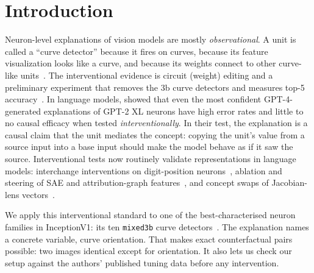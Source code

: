\documentclass[11pt]{article}
\begin{document}
\section{Introduction}
Neuron-level explanations of vision models are mostly \emph{observational}. A unit is called a ``curve detector'' because it fires on curves, because its feature visualization looks like a curve, and because its weights connect to other curve-like units~\cite{olah2020zoom,cammarata2020curve,cammarata2021circuits}. The interventional evidence is circuit (weight) editing and a preliminary experiment that removes the 3b curve detectors and measures top-5 accuracy~\cite{cammarata2021circuits}. In language models, \citet{huang2023rigorously} showed that even the most confident GPT-4-generated explanations of GPT-2 XL neurons have high error rates and little to no causal efficacy when tested \emph{interventionally}. In their test, the explanation is a causal claim that the unit mediates the concept: copying the unit's value from a source input into a base input should make the model behave as if it saw the source. Interventional tests now routinely validate representations in language models: interchange interventions on digit-position neurons~\cite{baeumel2025modular}, ablation and steering of SAE and attribution-graph features~\cite{bricken2023monosemanticity,ameisen2025circuit}, and concept swaps of Jacobian-lens vectors~\cite{gurnee2026workspace}.

We apply this interventional standard to one of the best-characterised neuron families in InceptionV1: its ten \texttt{mixed3b} curve detectors~\cite{cammarata2020curve,gorton2024missing}. The explanation names a concrete variable, curve orientation. That makes exact counterfactual pairs possible: two images identical except for orientation. It also lets us check our setup against the authors' published tuning data before any intervention.
\end{document}
